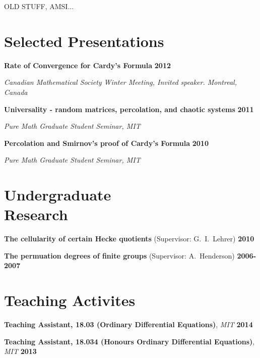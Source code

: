 \documentclass[margin,line]{resume}
\begin{document}
\begin{resume}
OLD STUFF, AMSI...

    \section{\mysidestyle Selected Presentations}

\textbf{Rate of Convergence for Cardy's Formula}
\hfill \textbf{2012}%

\vspace{-2.5mm}
      \textit{Canadian Mathematical Society Winter Meeting, Invited speaker. Montreal, Canada}

\vspace{-2.5mm}
\textbf{Universality - random matrices, percolation, and chaotic systems}
\hfill \textbf{2011}%

\vspace{-2.5mm}
      \textit{Pure Math Graduate Student Seminar, MIT}

\vspace{-2.5mm}
\textbf{Percolation and Smirnov's proof of Cardy's Formula}
\hfill \textbf{2010}%

\vspace{-2.5mm}
      \textit{Pure Math Graduate Student Seminar, MIT}
      
      
          \section{\mysidestyle Undergraduate \\ Research}


\noindent \textbf{The cellularity of certain Hecke quotients} (Supervisor: G.\ I.\ Lehrer) 
\hfill \textbf{2010}

 \vspace{-2mm}
\noindent \textbf{The permuation degrees of finite groups} (Supervisor: A.\ Henderson) 
\hfill \textbf{2006-2007}      
      
         \section{\mysidestyle Teaching Activites}
 \textbf{Teaching Assistant, 18.03 (Ordinary Differential Equations)}, \textsl{MIT} \hfill \textbf{2014}
    
    \vspace{-2mm}
    \textbf{Teaching Assistant, 18.034 (Honours Ordinary Differential Equations)}, \textsl{MIT} \hfill \textbf{2013}
    

\end{resume}
\end{document}
